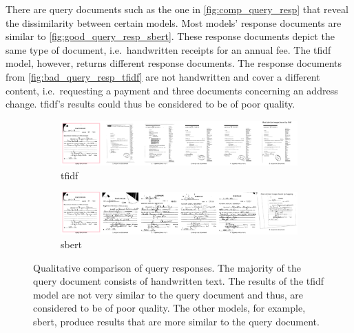 There are query documents such as the one in \autoref{fig:comp_query_resp} that reveal the dissimilarity between certain models.
Most models' response documents are similar to \autoref{fig:good_query_resp_sbert}.
These response documents depict the same type of document, i.e.\ handwritten receipts for an annual fee.
The \ac{tfidf} model, however, returns different response documents.
The response documents from \autoref{fig:bad_query_resp_tfidf} are not handwritten and cover a different content, 
i.e.\ requesting a payment and three documents concerning an address change.
\ac{tfidf}'s results could thus be considered to be of poor quality.

\begin{figure}[h!]
    \ContinuedFloat
    \begin{subfigure}{\textwidth}
        \centering
        \includegraphics[width=1\textwidth]{images/query_results/4542b223317eba23e4bda3e1536d61c8e2d2890a6439830ca8c62650bc1aac70/Most_similar_images_found_by_tfidf.pdf}
        \caption{\ac{tfidf}}
        \label{fig:bad_query_resp_tfidf}
    \end{subfigure}

    \begin{subfigure}{\textwidth}
        \centering
        \includegraphics[width=1\textwidth]{images/query_results/4542b223317eba23e4bda3e1536d61c8e2d2890a6439830ca8c62650bc1aac70/Most_similar_images_found_by_hugging.pdf}
        \caption{\ac{sbert}}
        \label{fig:good_query_resp_sbert}
    \end{subfigure}

\caption[Qualitative comparison of query responses]{Qualitative comparison of query responses.
The majority of the query document consists of handwritten text.
The results of the \ac{tfidf} model are not very similar to the query document and thus, are considered to be of poor quality.
The other models, for example, \ac{sbert}, produce results that are more similar to the query document.
}
\label{fig:comp_query_resp}
\end{figure}

